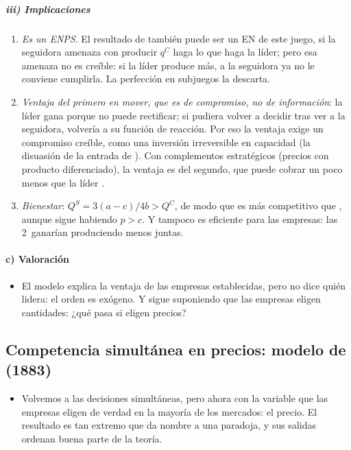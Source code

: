 \documentclass[11pt]{article}
\begin{document}
\subparagraph{iii) Implicaciones}

\begin{enumerate}
\item \emph{Es un ENPS}. El resultado de  también puede ser un EN de este juego, si la seguidora amenaza con producir $q^C$ haga lo que haga la líder; pero esa amenaza no es creíble: si la líder produce más, a la seguidora ya no le conviene cumplirla. La perfección en subjuegos la descarta.
\item \emph{Ventaja del primero en mover, que es de compromiso, no de información}: la líder gana porque no puede rectificar; si pudiera volver a decidir tras ver a la seguidora, volvería a su función de reacción. Por eso la ventaja exige un compromiso creíble, como una inversión irreversible en capacidad (la disuasión de la entrada de  ). Con complementos estratégicos (precios con producto diferenciado), la ventaja es del segundo, que puede cobrar un poco menos que la líder\nocite{GalOr1985First} .
\item \emph{Bienestar}: $Q^S=3(a-c)/4b>Q^C$, de modo que  es más competitivo que , aunque sigue habiendo $p>c$. Y tampoco es eficiente para las empresas: las 2~ganarían produciendo menos juntas.
\end{enumerate}

\paragraph{c) Valoración}

\begin{itemize}
\item El modelo explica la ventaja de las empresas establecidas, pero no dice quién lidera: el orden es exógeno. Y sigue suponiendo que las empresas eligen cantidades: ¿qué pasa si eligen precios?
\end{itemize}

\subsection{Competencia simultánea en precios: modelo de  (1883)}\label{sec:bertrand}

\begin{itemize}
\item Volvemos a las decisiones simultáneas, pero ahora con la variable que las empresas eligen de verdad en la mayoría de los mercados: el precio. El resultado es tan extremo que da nombre a una paradoja, y sus salidas ordenan buena parte de la teoría.
\end{itemize}
\end{document}
